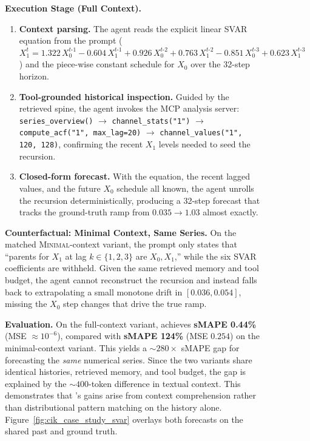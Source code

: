 \begin{figure}[h]
{\begin{tcolorbox}[colback=gray!5!white, colframe=pink!120,
title=Case Study C.1: \method{} on Context-is-Key: How Textual Context Steers the Forecast,
boxrule=0.3mm, width=1.2\textwidth, arc=2mm, auto outer arc=true]
\textbf{Execution Stage (Full Context).}
\begin{enumerate}
    \item \textbf{Context parsing.}
    The agent reads the explicit linear SVAR equation from the prompt
    ($X_1^{t} = 1.322\,X_0^{t\text{-}1} - 0.604\,X_1^{t\text{-}1} +
    0.926\,X_0^{t\text{-}2} + 0.763\,X_1^{t\text{-}2} -
    0.851\,X_0^{t\text{-}3} + 0.623\,X_1^{t\text{-}3}$) and the
    piece-wise constant schedule for $X_0$ over the 32-step horizon.

    \item \textbf{Tool-grounded historical inspection.}
    Guided by the retrieved spine, the agent invokes the MCP analysis
    server: \texttt{series\_overview()} $\to$ \texttt{channel\_stats("1")}
    $\to$ \texttt{compute\_acf("1", max\_lag=20)} $\to$ \texttt{channel\_values("1", 120, 128)},
    confirming the recent $X_1$ levels needed to seed the recursion.

    \item \textbf{Closed-form forecast.}
    With the equation, the recent lagged values, and the future $X_0$
    schedule all known, the agent unrolls the recursion deterministically,
    producing a 32-step forecast that tracks the ground-truth ramp from
    $0.035 \!\to\! 1.03$ almost exactly.
\end{enumerate}

\textbf{Counterfactual: Minimal Context, Same Series.}
On the matched \textsc{Minimal}-context variant, the prompt only states that
``parents for $X_1$ at lag $k\!\in\!\{1,2,3\}$ are $X_0, X_1$,'' while the
six SVAR coefficients are withheld. 
Given the same retrieved memory and tool budget, the agent cannot reconstruct the
recursion and instead falls back to extrapolating a small monotone drift in
$[0.036, 0.054]$, missing the $X_0$ step changes that drive the true ramp.

\vspace{2mm}
\textbf{Evaluation.}
On the full-context variant, \method{} achieves \textbf{sMAPE 0.44\%}
(MSE $\approx\!10^{-6}$), compared with \textbf{sMAPE 124\%}
(MSE $0.254$) on the minimal-context variant. 
This yields a $\sim\!280\times$ sMAPE gap for forecasting the
\emph{same} numerical series. 
Since the two variants share identical histories, retrieved memory, and tool
budget, the gap is explained by the $\sim\!400$-token difference in textual
context. 
This demonstrates that \method{}'s gains arise from context comprehension rather
than distributional pattern matching on the history alone. 
Figure~\ref{fig:cik_case_study_svar} overlays both forecasts on the shared past
and ground truth.


\end{tcolorbox}}
\end{figure}
